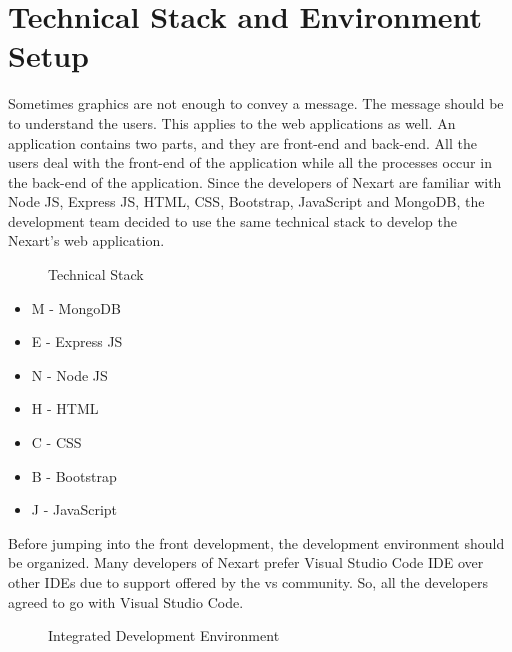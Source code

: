\documentclass[a4Paper,12pt]{report}
\begin{document}
\section{Technical Stack and Environment Setup}
Sometimes graphics are not enough to convey a message. The message should be to understand the users. This applies to the web applications as well. An application contains two parts, and they are front-end and back-end. All the users deal with the front-end of the application while all the processes occur in the back-end of the application. Since the developers of Nexart are familiar with Node JS, Express JS, HTML, CSS, Bootstrap, JavaScript and MongoDB, the development team decided to use the same technical stack to develop the Nexart’s web application.
\begin{figure}[H]
\centering
{}
\caption{Technical Stack}
\end{figure}
\begin{itemize}
\item M - MongoDB
\item E - Express JS
\item N - Node JS
\item H - HTML
\item C - CSS
\item B - Bootstrap
\item J - JavaScript
\end{itemize}
Before jumping into the front development, the development environment should be organized. Many developers of Nexart prefer Visual Studio Code IDE over other IDEs due to support offered by the vs community. So, all the developers agreed to go with Visual Studio Code.
\begin{figure}[H]
\centering
{}
\caption{Integrated Development Environment}
\end{figure}
\end{document}
